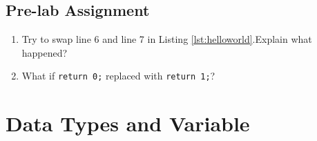 \subsection{Pre-lab Assignment}
\begin{enumerate}
	\item Try to swap line 6 and line 7 in Listing \ref{lst:helloworld}.Explain what happened?
	\item What if \verb|return 0;| replaced with \verb|return 1;|?
\end{enumerate}


\section{Data Types and Variable}
